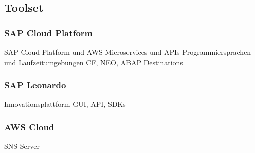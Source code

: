 \subsection{Toolset}
\subsubsection{SAP Cloud Platform}

SAP Cloud Platform und AWS Microservices und APIs
Programmiersprachen und Laufzeitumgebungen
CF, NEO, ABAP
Destinations

\subsubsection{SAP Leonardo}
Innovationsplattform
GUI, API, SDKs

\subsubsection{AWS Cloud}
SNS-Server

\newpage
